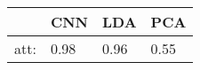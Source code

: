 \begin{tabular}{|r|l|l|l|}
  \hline
    & CNN & LDA & PCA \\
  \hline
  att: & 0.98 & 0.96 & 0.55 \\
  \hline
\end{tabular}
